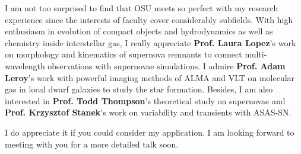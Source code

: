 \documentclass[11pt, a4paper]{awesome-cv} %
\begin{document}
\begin{cvletter}
I am not too surprised to find that OSU meets so perfect with my research experience since the interests of faculty cover considerably subfields. With high enthusiasm in evolution of compact objects and hydrodynamics as well as chemistry inside interstellar gas, I really appreciate \textbf{Prof. Laura Lopez}'s work on morphology and kinematics of supernova remnants to connect multi-wavelength observations with supernovae simulations. I admire \textbf{Prof. Adam Leroy}'s work with powerful imaging methods of ALMA and VLT on molecular gas in local dwarf galaxies to study the star formation. Besides, I am also interested in \textbf{Prof. Todd Thompson}'s theoretical study on supernovae and \textbf{Prof. Krzysztof Stanek}'s work on variability and transients with ASAS-SN.

I do appreciate it if you could consider my application. I am looking forward to meeting with you for a more detailed talk soon.

\end{cvletter}


\end{document}
